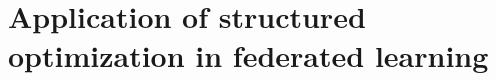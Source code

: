 \chapter{Application of structured optimization in federated learning}
\label{ch:App-Struc-Opt-Fed-Learn}